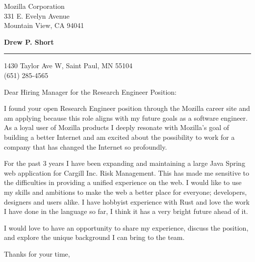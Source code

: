 \documentclass{letter} %
\begin{document}
\signature{Drew P. Short}           %
\longindentation=0pt                       %
\let\raggedleft\raggedright                %
 
 

\begin{letter}{
Mozilla Corporation \\
331 E. Evelyn Avenue \\
Mountain View, CA 94041}


\begin{flushleft}
{\large\bf Drew P. Short}
\end{flushleft}
\medskip\hrule height 1pt
\begin{flushright}
\hfill 1430 Taylor Ave W, Saint Paul, MN 55104 \\
\hfill (651) 285-4565 
\end{flushright} 
\vfill %

 
\opening{Dear Hiring Manager for the Research Engineer Position:} 
 
\noindent I found your open Research Engineer position through the
Mozilla career site and am applying because this role aligns with my
future goals as a software engineer. As a loyal user of Mozilla
products I deeply resonate with Mozilla's goal of building a better
Internet and am excited about the possibility to work for a company
that has changed the Internet so profoundly.
 
\noindent For the past 3 years I have been expanding and maintaining
a large Java Spring web application for Cargill Inc. Risk Management.
This has made me sensitive to the difficulties in providing a unified
experience on the web. I would like to use my skills and ambitions
to make the web a better place for everyone; developers, designers and users
alike. I have hobbyist experience with Rust and love the work I
have done in the language so far, I think it has a very bright future
ahead of it.
 
\noindent I would love to have an opportunity to share my experience,
discuss the position, and explore the unique background I can bring
to the team.
 
\closing{Thanks for your time,} 
 

 

\end{letter}
 
\end{document}
